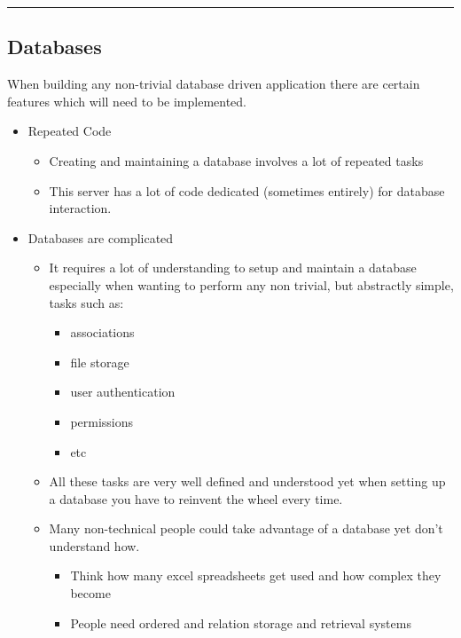 \documentclass[
  12pt,
]{article}
\providecommand{\tightlist}{%
  \setlength{\itemsep}{0pt}\setlength{\parskip}{0pt}}
\begin{document}
\begin{center}\rule{0.5\linewidth}{\linethickness}\end{center}

\hypertarget{databases}{%
\subsection{Databases}\label{databases}}

When building any non-trivial database driven application there are
certain features which will need to be implemented.

\begin{itemize}
\item
  Repeated Code

  \begin{itemize}
  \item
    Creating and maintaining a database involves a lot of repeated tasks
  \item
    This server has a lot of code dedicated (sometimes entirely) for
    database interaction.
  \end{itemize}
\item
  Databases are complicated

  \begin{itemize}
  \item
    It requires a lot of understanding to setup and maintain a database
    especially when wanting to perform any non trivial, but abstractly
    simple, tasks such as:

    \begin{itemize}
    \tightlist
    \item
      associations
    \item
      file storage
    \item
      user authentication
    \item
      permissions
    \item
      etc
    \end{itemize}
  \item
    All these tasks are very well defined and understood yet when
    setting up a database you have to reinvent the wheel every time.
  \item
    Many non-technical people could take advantage of a database yet
    don't understand how.

    \begin{itemize}
    \tightlist
    \item
      Think how many excel spreadsheets get used and how complex they
      become
    \item
      People need ordered and relation storage and retrieval systems
    \end{itemize}
  \end{itemize}
\end{itemize}
\end{document}
